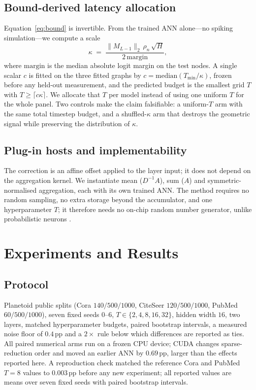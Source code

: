 \documentclass[10pt,twocolumn]{article}
\newcommand{\hdim}{H}
\newcommand{\Tmin}{T_{\min}}
\newcommand{\rhon}{\rho_n}
\begin{document}
\subsection{Bound-derived latency allocation}
Equation~\eqref{eq:bound} is invertible. From the trained ANN alone---no spiking simulation---we
compute a scale
\begin{equation}
\kappa \;=\; \frac{\|M_{L-1}\|_2\,\rhon\,\sqrt{\hdim}}{2\,\mathrm{margin}},
\label{eq:kappa}
\end{equation}
where $\mathrm{margin}$ is the median absolute logit margin on the test nodes. A single scalar
$c$ is fitted on the three fitted graphs by $c=\mathrm{median}(\Tmin/\kappa)$, frozen before any
held-out measurement, and the predicted budget is the smallest grid $T$ with
$T\ge\lceil c\kappa\rceil$. We allocate that $T$ per model instead of using one uniform $T$ for
the whole panel. Two controls make the claim falsifiable: a uniform-$T$ arm with the same total
timestep budget, and a shuffled-$\kappa$ arm that destroys the geometric signal while preserving
the distribution of $\kappa$.

\subsection{Plug-in hosts and implementability}
The correction is an affine offset applied to the layer input; it does not depend on the
aggregation kernel. We instantiate mean ($D^{-1}A$), sum ($A$) and symmetric-normalised
aggregation, each with its own trained ANN. The method requires no random sampling, no extra
storage beyond the accumulator, and one hyperparameter $T$; it therefore needs no on-chip random
number generator, unlike probabilistic neurons \cite{tpp2025,probsnn2019}.



\section{Experiments and Results}
\label{sec:experiments}

\subsection{Protocol}
Planetoid public splits (Cora $140/500/1000$, CiteSeer $120/500/1000$, PubMed $60/500/1000$),
seven fixed seeds $0$--$6$, $T\in\{2,4,8,16,32\}$, hidden width $16$, two layers, matched
hyperparameter budgets, paired bootstrap intervals, a measured noise floor of $0.4$\,pp and a
$2\times$ rule below which differences are reported as ties. All paired numerical arms run on a
frozen CPU device; CUDA changes sparse-reduction order and moved an earlier ANN by $0.69$\,pp,
larger than the effects reported here. A reproduction check matched the reference Cora and PubMed $T{=}8$ values to
$0.003$\,pp before any new experiment; all reported values are means over seven fixed seeds
with paired bootstrap intervals.
\end{document}
